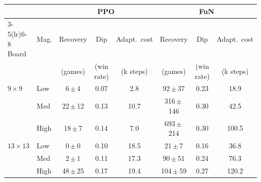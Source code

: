 \begin{table}[t]
  \centering
  \label{tab:phase2}
  \small
  \begin{tabular}{@{}ll ccc ccc@{}}
    \toprule
    & & \multicolumn{3}{c}{PPO} & \multicolumn{3}{c}{FuN} \\
    \cmidrule(lr){3-5}\cmidrule(lr){6-8}
    Board & Mag. & Recovery & Dip & Adapt.\ cost & Recovery & Dip & Adapt.\ cost \\
    & & (games) & (win rate) & (k steps) & (games) & (win rate) & (k steps) \\
    \midrule
    $9\times9$ & Low & 6\,$\pm$\,4 & 0.07 & 2.8 & 92\,$\pm$\,37 & 0.23 & 18.9 \\
     & Med & 22\,$\pm$\,12 & 0.13 & 10.7 & 316\,$\pm$\,146 & 0.30 & 42.5 \\
     & High & 18\,$\pm$\,7 & 0.14 & 7.0 & 693\,$\pm$\,214 & 0.30 & 100.5 \\
    \midrule
    $13\times13$ & Low & 0\,$\pm$\,0 & 0.10 & 18.5 & 21\,$\pm$\,7 & 0.16 & 36.8 \\
     & Med & 2\,$\pm$\,1 & 0.11 & 17.3 & 90\,$\pm$\,51 & 0.24 & 76.3 \\
     & High & 48\,$\pm$\,25 & 0.17 & 19.4 & 104\,$\pm$\,59 & 0.27 & 120.2 \\
    \bottomrule
  \end{tabular}
\end{table}

